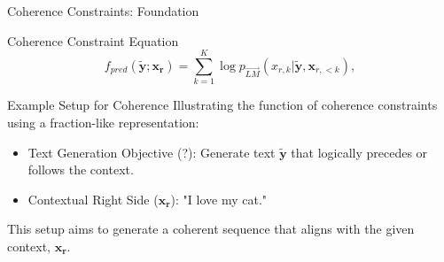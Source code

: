 \documentclass{beamer}
\begin{document}
\begin{frame}{Coherence Constraints: Foundation}
    \begin{block}{Coherence Constraint Equation}
        \begin{equation}
            f_{pred}(\mathbf{\tilde{y}}; \mathbf{x_r}) = \sum_{k=1}^{K} \log {p}_{\overrightarrow{LM}}({x_{r,k}}|\mathbf{\tilde{y}}, {\mathbf{x}_{r,<k}}),
        \end{equation}
    \end{block}
    \begin{block}{Example Setup for Coherence}
        Illustrating the function of coherence constraints using a fraction-like representation:
        \begin{itemize}
            \item Text Generation Objective (?): Generate text $\mathbf{\tilde{y}}$ that logically precedes or follows the context.
            \item Contextual Right Side ($\mathbf{x_r}$): "I love my cat."
        \end{itemize}
        This setup aims to generate a coherent sequence that aligns with the given context, $\mathbf{x_r}$.
    \end{block}
\end{frame}
\end{document}
